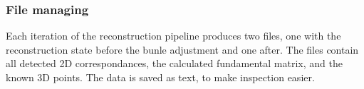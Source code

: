 \subsubsection{File managing}
Each iteration of the reconstruction pipeline produces two files, one with the reconstruction state before the bunle adjustment and one after. The files contain all detected 2D correspondances, the calculated fundamental matrix, and the known 3D points. The data is saved as text, to make inspection easier.